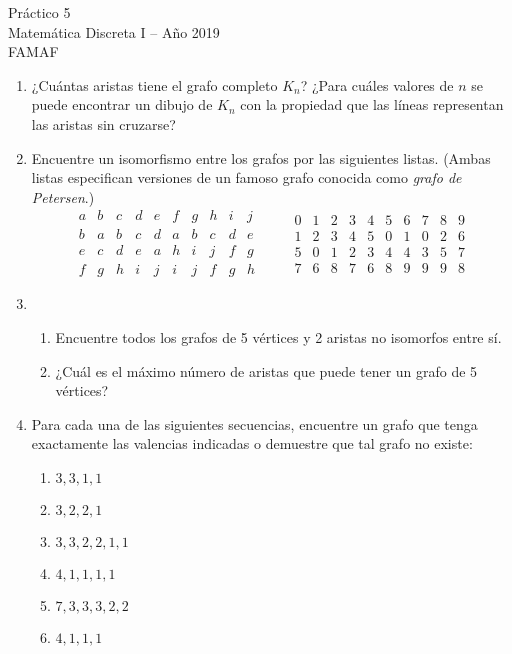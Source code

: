 \documentclass[12pt,spanish,makeidx]{amsbook}
\theoremstyle{definition}
\theoremstyle{remark}
\begin{document}
{\bf \begin{center} Práctico 5 \\ Matemática Discreta I -- Año 2019 \\ FAMAF \end{center}}

\medskip




\begin{enumerate}

\item  ¿Cuántas aristas tiene el  grafo completo $K_n$? ¿Para cuáles valores de $n$ se puede encontrar un dibujo de $K_n$ con la propiedad que las líneas representan las aristas sin cruzarse?


\medskip
\item Encuentre un isomorfismo entre los grafos por las siguientes listas. (Ambas listas especifican versiones de un famoso grafo conocida como {\it grafo de Petersen}.)
$$
\begin{matrix}
a&b&c&d&e&f&g&h&i&j\\ \hline
b&a&b&c&d&a&b&c&d&e\\
e&c&d&e&a&h&i&j&f&g\\
f&g&h&i&j&i&j&f&g&h
\end{matrix}
\qquad \begin{matrix}
0&1&2&3&4&5&6&7&8&9\\ \hline
1&2&3&4&5&0&1&0&2&6\\
5&0&1&2&3&4&4&3&5&7\\
7&6&8&7&6&8&9&9&9&8
\end{matrix}
$$

\medskip
\item
\begin{enumerate}
\item Encuentre todos los grafos de 5 vértices y 2 aristas no isomorfos entre sí.
 \item ¿Cuál es el máximo número de aristas que puede tener un grafo de 5 vértices?
\end{enumerate}

\medskip

\item Para cada una de las siguientes secuencias, encuentre un grafo que tenga exactamente las valencias indicadas o demuestre que tal grafo no existe:
\begin{multicols}{3}
\begin{enumerate}
\item $3,3,1,1$
\item $3,2,2,1$
\item $3,3,2,2,1,1$
\item $4,1,1,1,1$
\item $7,3,3,3,2,2$
\item $4,1,1,1$
\end{enumerate}
\end{multicols}


\end{enumerate}
\end{document}
